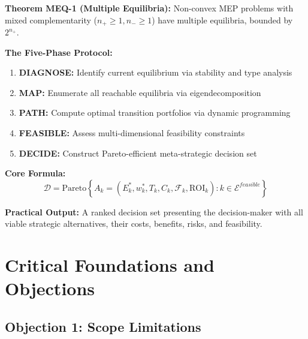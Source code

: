 \begin{tcolorbox}[colback=blue!5!white, colframe=blue!75!black,
    title=Key Results: Multiple Equilibria \& Strategic Navigation]

\textbf{Theorem MEQ-1 (Multiple Equilibria):}
Non-convex MEP problems with mixed complementarity ($n_+ \geq 1, n_- \geq 1$)
have multiple equilibria, bounded by $2^{n_+}$.

\textbf{The Five-Phase Protocol:}
\begin{enumerate}
    \item \textbf{DIAGNOSE:} Identify current equilibrium via stability and type analysis
    \item \textbf{MAP:} Enumerate all reachable equilibria via eigendecomposition
    \item \textbf{PATH:} Compute optimal transition portfolios via dynamic programming
    \item \textbf{FEASIBLE:} Assess multi-dimensional feasibility constraints
    \item \textbf{DECIDE:} Construct Pareto-efficient meta-strategic decision set
\end{enumerate}

\textbf{Core Formula:}
\begin{equation}
\mathcal{D} = \text{Pareto}\left\{ A_k = (E^*_k, w^*_k, T_k, C_k, \mathcal{F}_k, \text{ROI}_k) : k \in \mathcal{E}^{feasible} \right\}
\end{equation}

\textbf{Practical Output:} A ranked decision set presenting the decision-maker
with all viable strategic alternatives, their costs, benefits, risks, and feasibility.

\end{tcolorbox}


\section{Critical Foundations and Objections}
\label{sec:meq-foundations}

\subsection{Objection 1: Scope Limitations}

